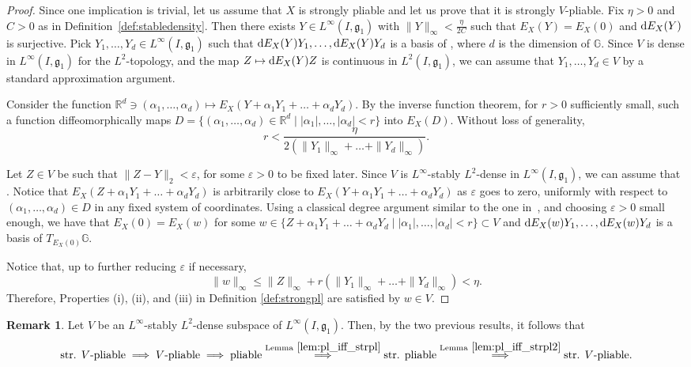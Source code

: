 \documentclass[10pt,a4paper]{amsart}
\numberwithin{equation}{section}
\theoremstyle{definition}
\newtheorem{Remark}[Theorem]{Remark}
\begin{document}
\begin{proof}
Since one implication is trivial, let us assume that $X$ is strongly
pliable and let us prove that it is strongly $V$-pliable.
 Fix $\eta>0$ and $C>0$ as in Definition~\ref{def:stabledensity}.
 Then there exists $Y\in L^\infty(I,{\mathfrak g}_1)$
 with $\|Y\|_\infty<\frac{\eta}{2C}$ such that $E_X(Y)=E_X(0)$ and
 ${\rm d}E_X(Y)$ is surjective. Pick $Y_1,\dots,Y_d\in L^\infty(I,{\mathfrak g}_1)$ such that
${\rm d}E_X(Y)Y_1,\dots,{\rm d}E_X(Y)Y_d$ is a basis of , where $d$ is the dimension of $\mathbb{G}$.
 Since $V$ is dense in $L^\infty(I,{\mathfrak g}_1)$ for the $L^2$-topology,
 and the map
 $Z\mapsto {\rm d}E_X(Y)Z$ is continuous in $L^2(I,{\mathfrak g}_1)$, we can assume that $Y_1,\dots,Y_d\in V$
 by a standard approximation argument.

Consider the function $\mathbb{R}^d\ni (\alpha_1,\dots,\alpha_d)\mapsto E_X(Y+\alpha_1 Y_1+\dots+\alpha_d Y_d)$.
 By the inverse function theorem, for $r>0$ sufficiently small,
 such a function diffeomorphically maps $D=\{(\alpha_1,\dots,\alpha_d)\in \mathbb{R}^d \mid |\alpha_1|,\dots,|\alpha_d|<r \}$ into $E_X(D)$.
 Without loss of generality, \[r<\frac{\eta}{2(\|Y_1\|_\infty+\dots+\|Y_d\|_\infty)}.\]

 Let $Z\in V$ be such that $\|Z-Y\|_2<\varepsilon$, for some $\varepsilon>0$ to be fixed later.
 Since $V$ is
 $L^\infty$-stably $L^2$-dense in $L^\infty(I,{\mathfrak g}_1)$, we can assume that .
 Notice that
 ${E_X(Z+\alpha_1 Y_1+\dots+\alpha_d Y_d)}$ is arbitrarily close to $E_X(Y+\alpha_1 Y_1+\dots+\alpha_d Y_d)$ as $\varepsilon$ goes to zero, uniformly with respect to $(\alpha_1,\dots,\alpha_d)\in D$
 in any fixed system of coordinates.
 Using a classical degree argument similar to the one in~\cite[Lemma~5.5]{SS18}, and choosing $\varepsilon>0$ small enough, we have that $E_X(0)=E_X(w)$ for some $w\in \{Z+\alpha_1 Y_1+\dots+\alpha_d Y_d\mid |\alpha_1|,\dots,|\alpha_d|<r\}\subset V$ and ${\rm d}E_X(w)Y_1,\dots,{\rm d}E_X(w)Y_d$ is a basis of $T_{E_X(0)}\mathbb{G}$.

 Notice that, up to further reducing $\varepsilon$ if necessary,
 \[
 \|w\|_\infty\le \|Z\|_\infty +r (\|Y_1\|_\infty+\dots+\|Y_d\|_\infty)< \eta.
 \]
 Therefore, Properties (i), (ii), and (iii) in Definition \ref{def:strongpl} are satisfied by $w\in V$.
\end{proof}

\begin{Remark}\label{rmk:Vdense}
 Let $V$ be
 an $L^\infty$-stably $L^2$-dense subspace of $ L^\infty(I,{\mathfrak g}_1)$.
 Then, by the two previous results, it follows that
 \begin{equation*}
 \text{str. $V$-pliable} \implies \text{$V$-pliable} \implies \text{pliable} \stackrel{\rm Lemma \ \ref{lem:pl_iff_strpl}}{\implies} \text{str. pliable} \stackrel{\rm Lemma \ \ref{lem:pl_iff_strpl2}}{\implies} \text{str. $V$-pliable}.
 \end{equation*}
\end{Remark}
\end{document}
